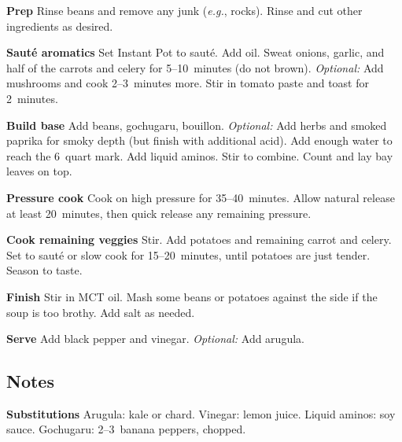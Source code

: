 \documentclass[
    fontsize=10pt,
    letterpaper,oneside,paper=portrait
]{scrartcl}
\newcommand{\paragrcompact}[1]{\textbf{\sffamily #1}\quad}
\begin{document}
\paragrcompact{Prep} Rinse beans and remove any junk (\textit{e.g.}, rocks). Rinse and cut other ingredients as desired.

\paragrcompact{Sauté aromatics} Set Instant Pot to sauté. Add oil. Sweat onions, garlic, and half of the carrots and celery for 5--10~minutes (do not brown). \textit{Optional:} Add mushrooms and cook 2--3~minutes more. Stir in tomato paste and toast for 2~minutes.

\paragrcompact{Build base} Add beans, gochugaru, bouillon. \textit{Optional:} Add herbs and smoked paprika for smoky depth (but finish with additional acid). Add enough water to reach the 6~quart mark. Add liquid aminos. Stir to combine. Count and lay bay leaves on top.

\paragrcompact{Pressure cook} Cook on high pressure for 35--40~minutes. Allow natural release at least 20~minutes, then quick release any remaining pressure.

\paragrcompact{Cook remaining veggies} Stir. Add potatoes and remaining carrot and celery. Set to sauté or slow cook for 15--20~minutes, until potatoes are just tender. Season to taste.

\paragrcompact{Finish} Stir in MCT oil. Mash some beans or potatoes against the side if the soup is too brothy. Add salt as needed.

\paragrcompact{Serve} Add black pepper and vinegar. \textit{Optional:} Add arugula.

\subsection*{Notes}

\paragrcompact{Substitutions} Arugula: kale or chard. Vinegar: lemon juice. Liquid aminos: soy sauce. Gochugaru: 2--3~banana peppers, chopped.
\end{document}

